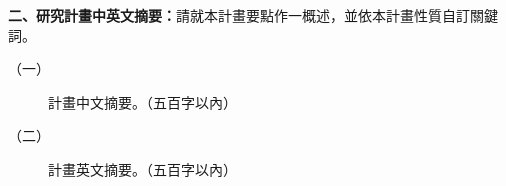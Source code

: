 \documentclass[12pt,a4paper,openany]{article}
\begin{document}
\newtheorem{thm}{Theorem}
\newtheorem{lem}{Lemma}
\newtheorem{cor}{Corollary}
\newtheorem{prop}{Proposition}
\newtheorem{conj}{Conjecture}

\baselineskip 7mm

\noindent
\textbf{\large 二、研究計畫中英文摘要：}請就本計畫要點作一概述，並依本計畫性質自訂關鍵詞。 
\begin{description}
\item[（一）] 計畫中文摘要。（五百字以內） 
\vspace{4mm}



\vspace{4mm}
\item[（二）]  計畫英文摘要。（五百字以內） 



\end{description}
\label{LastPage}
\end{document}
